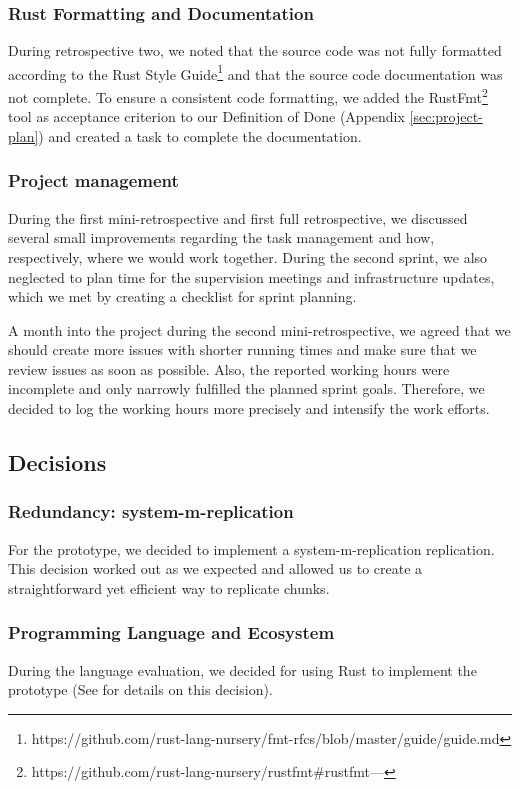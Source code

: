\subsubsection{Rust Formatting and Documentation}
During retrospective two, we noted that the source code was not fully formatted according to the Rust Style Guide\footnote{https://github.com/rust-lang-nursery/fmt-rfcs/blob/master/guide/guide.md} and that the source code documentation was not complete. To ensure a consistent code formatting, we added the RustFmt\footnote{https://github.com/rust-lang-nursery/rustfmt\#rustfmt---} tool as acceptance criterion to our Definition of Done (Appendix \ref{sec:project-plan}) and created a task to complete the documentation.

\subsubsection{Project management}
During the first mini-retrospective and first full retrospective, we discussed several small improvements regarding the task management and how, respectively, where we would work together. During the second sprint, we also neglected to plan time for the supervision meetings and infrastructure updates, which we met by creating a checklist for sprint planning.

A month into the project during the second mini-retrospective, we agreed that we should create more issues with shorter running times and make sure that we review issues as soon as possible. Also, the reported working hours were incomplete and only narrowly fulfilled the planned sprint goals. Therefore, we decided to log the working hours more precisely and intensify the work efforts.


\subsection{Decisions}
\subsubsection{Redundancy: \gls{system-m-replication}}
For the prototype, we decided to implement a \gls{system-m-replication} replication. This decision worked out as we expected and allowed us to create a straightforward yet efficient way to replicate \glspl{chunk}.

\subsubsection{Programming Language and Ecosystem}
During the language evaluation, we decided for using Rust to implement the prototype (See  for details on this decision).

